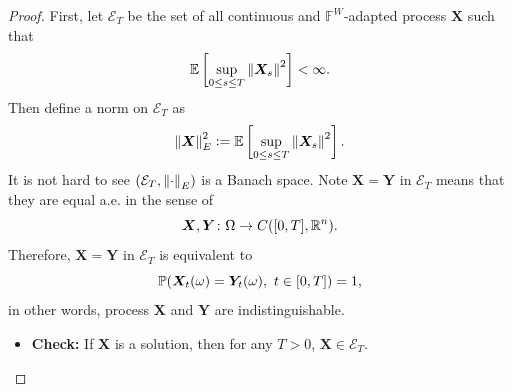 \begin{proof}
    First, let $\mathcal{E}_T$ be the set of all continuous and $\mathbb{F}^W$-adapted process $\bm{X}$ such that 
    \begin{equation*}
        \mathbb{E}\left[\sup_{0 \leq s \leq T} \left\lVert\bm{X}_s\right\lVert^2\right] < \infty.
    \end{equation*}
    Then define a norm on $\mathcal{E}_T$ as
    \begin{equation*}
        \left\lVert\bm{X}\right\lVert_E^2 \vcentcolon= \mathbb{E}\left[\sup_{0 \leq s \leq T} \left\lVert\bm{X}_s\right\lVert^2\right].
    \end{equation*}
    It is not hard to see $(\mathcal{E}_T,\left\lVert\cdot\right\lVert_E)$ is a Banach space. Note $\bm{X} = \bm{Y}$ in $\mathcal{E}_T$ means that they are equal a.e. in the sense of 
    \begin{equation*}
        \bm{X},\bm{Y} \colon \Omega \rightarrow C([0,T],\mathbb{R}^n).
    \end{equation*}
    Therefore, $\bm{X} = \bm{Y}$ in $\mathcal{E}_T$ is equivalent to
    \begin{equation*}
        \mathbb{P}(\bm{X}_t(\omega) = \bm{Y}_t(\omega),~t \in [0,T]) = 1,
    \end{equation*}
    in other words, process $\bm{X}$ and $\bm{Y}$ are indistinguishable.
    \begin{itemize}
        \item \textbf{Check:} If $\bm{X}$ is a solution, then for any $T > 0$, $\bm{X} \in \mathcal{E}_T$.


\end{itemize}
\end{proof}
